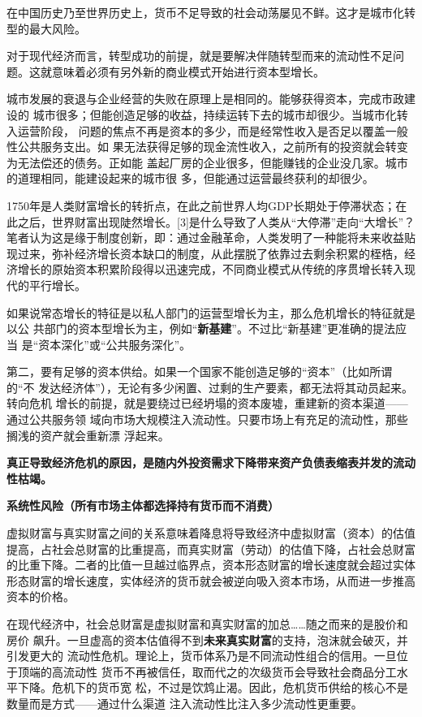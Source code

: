 在中国历史乃至世界历史上，货币不足导致的社会动荡屡见不鲜。这才是城市化转型的最大风险。

对于现代经济而言，转型成功的前提，就是要解决伴随转型而来的流动性不足问题。这就意味着必须有另外新的商业模式开始进行资本型增长。

城市发展的衰退与企业经营的失败在原理上是相同的。能够获得资本，完成市政建设的
城市很多；但能创造足够的收益，持续运转下去的城市却很少。当城市化转入运营阶段，
问题的焦点不再是资本的多少，而是经常性收入是否足以覆盖一般性公共服务支出。如
果无法获得足够的现金流性收入，之前所有的投资就会转变为无法偿还的债务。正如能
盖起厂房的企业很多，但能赚钱的企业没几家。城市的道理相同，能建设起来的城市很
多，但能通过运营最终获利的却很少。

1750年是人类财富增长的转折点，在此之前世界人均GDP长期处于停滞状态；在此之后，世界财富出现陡然增长。[3]是什么导致了人类从“大停滞”走向“大增长”？笔者认为这是缘于制度创新，即：通过金融革命，人类发明了一种能将未来收益贴现过来，弥补经济增长资本缺口的制度，从此摆脱了依靠过去剩余积累的桎梏，经济增长的原始资本积累阶段得以迅速完成，不同商业模式从传统的序贯增长转入现代的平行增长。

如果说常态增长的特征是以私人部门的运营型增长为主，那么危机增长的特征就是以公
共部门的资本型增长为主，例如“\textbf{新基建}”。不过比“新基建”更准确的提法应当
是“资本深化”或“公共服务深化”。

第二，要有足够的资本供给。如果一个国家不能创造足够的“资本”（比如所谓的“不
发达经济体”），无论有多少闲置、过剩的生产要素，都无法将其动员起来。转向危机
增长的前提，就是要绕过已经坍塌的资本废墟，重建新的资本渠道——通过公共服务领
域向市场大规模注入流动性。只要市场上有充足的流动性，那些搁浅的资产就会重新漂
浮起来。

\textbf{真正导致经济危机的原因，是随内外投资需求下降带来资产负债表缩表并发的流动性枯竭。}

\textbf{系统性风险（所有市场主体都选择持有货币而不消费）}

虚拟财富与真实财富之间的关系意味着降息将导致经济中虚拟财富（资本）的估值提高，占社会总财富的比重提高，而真实财富（劳动）的估值下降，占社会总财富的比重下降。二者的比值一旦越过临界点，资本形态财富的增长速度就会超过实体形态财富的增长速度，实体经济的货币就会被逆向吸入资本市场，从而进一步推高资本的价格。

在现代经济中，社会总财富是虚拟财富和真实财富的加总……随之而来的是股价和房价
飙升。一旦虚高的资本估值得不到\textbf{未来真实财富}的支持，泡沫就会破灭，并引发更大的
流动性危机。理论上，货币体系乃是不同流动性组合的信用。一旦位于顶端的高流动性
货币不再被信任，取而代之的次级货币会导致社会商品分工水平下降。危机下的货币宽
松，不过是饮鸩止渴。因此，危机货币供给的核心不是数量而是方式——通过什么渠道
注入流动性比注入多少流动性更重要。

